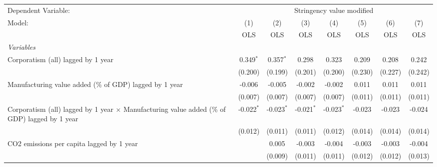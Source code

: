 
\begingroup
\centering
\begin{tabular}{lccccccc}
   \toprule
   Dependent Variable: & \multicolumn{7}{c}{Stringency value modified}\\
   Model:                                                                                               & (1)          & (2)          & (3)          & (4)          & (5)          & (6)          & (7)\\  
                                                                                                        &  OLS         & OLS          & OLS          & OLS          & OLS          & OLS          & OLS\\  
   \midrule
   \emph{Variables}\\
   Corporatism (all) lagged by 1 year                                                                   & 0.349$^{*}$  & 0.357$^{*}$  & 0.298        & 0.323        & 0.209        & 0.208        & 0.242\\   
                                                                                                        & (0.200)      & (0.199)      & (0.201)      & (0.200)      & (0.230)      & (0.227)      & (0.242)\\   
   Manufacturing value added (\% of GDP) lagged by 1 year                                               & -0.006       & -0.005       & -0.002       & -0.002       & 0.011        & 0.011        & 0.011\\   
                                                                                                        & (0.007)      & (0.007)      & (0.007)      & (0.007)      & (0.011)      & (0.011)      & (0.011)\\   
   Corporatism (all) lagged by 1 year $\times$ Manufacturing value added (\% of GDP) lagged by 1 year   & -0.022$^{*}$ & -0.023$^{*}$ & -0.021$^{*}$ & -0.023$^{*}$ & -0.023       & -0.023       & -0.024\\   
                                                                                                        & (0.012)      & (0.011)      & (0.011)      & (0.012)      & (0.014)      & (0.014)      & (0.014)\\   
   CO2 emissions per capita lagged by 1 year                                                            &              & 0.005        & -0.003       & -0.004       & -0.003       & -0.003       & -0.004\\   
                                                                                                        &              & (0.009)      & (0.011)      & (0.011)      & (0.012)      & (0.012)      & (0.013)\\   

\end{tabular}
